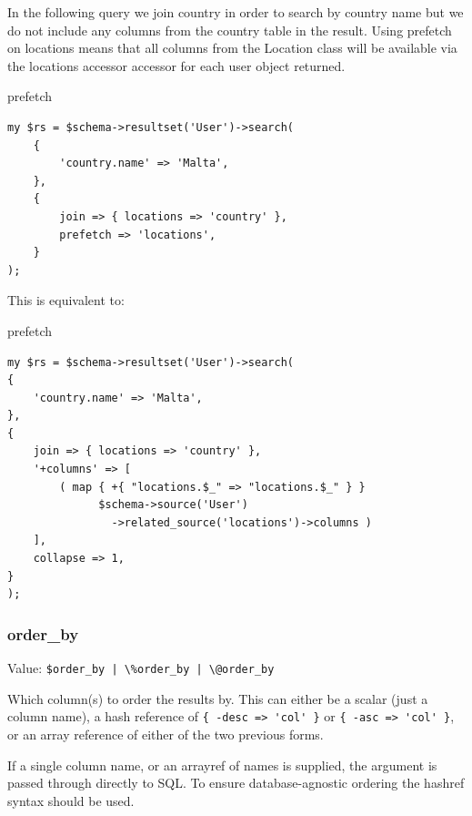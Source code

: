 In the following query we join country in order to search by country name
but we do not include any columns from the country table in the
result. Using prefetch on locations means that all columns from the Location
class will be available via the locations accessor accessor for each user
object returned.

\begin{frame}[fragile]{prefetch}
\begin{lstlisting}
my $rs = $schema->resultset('User')->search(
    {
        'country.name' => 'Malta',
    },
    {
        join => { locations => 'country' },
        prefetch => 'locations',
    }
);
\end{lstlisting}
\end{frame}

This is equivalent to:

\begin{frame}[fragile]{prefetch}
\begin{lstlisting}
my $rs = $schema->resultset('User')->search(
{
    'country.name' => 'Malta',
},
{
    join => { locations => 'country' },
    '+columns' => [
        ( map { +{ "locations.$_" => "locations.$_" } }
              $schema->source('User')
                ->related_source('locations')->columns )
    ],
    collapse => 1,
}
);
\end{lstlisting}
\end{frame}

\subsubsection{order\_by}

Value: \verb=$order_by | \%order_by | \@order_by=

Which column(s) to order the results by. This can either be a scalar (just a
column name), a hash reference of \verb|{ -desc => 'col' }| or 
\verb|{ -asc => 'col' }|, or an array reference of either of the two
previous forms.

If a single column name, or an arrayref of names is supplied, the argument
is passed through directly to SQL. To ensure database-agnostic ordering the
hashref syntax should be used.

